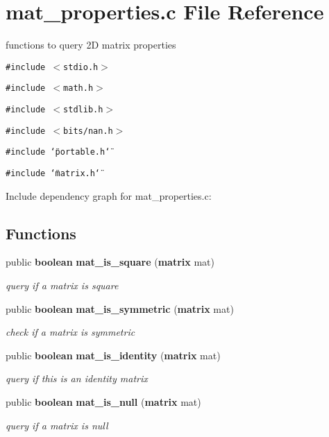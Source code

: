 \section{mat\_\-properties.c File Reference}
\label{mat__properties_8c}
functions to query 2D matrix properties 


{\tt \#include $<$stdio.h$>$}\par
{\tt \#include $<$math.h$>$}\par
{\tt \#include $<$stdlib.h$>$}\par
{\tt \#include $<$bits/nan.h$>$}\par
{\tt \#include \char`\"{}portable.h\char`\"{}}\par
{\tt \#include \char`\"{}matrix.h\char`\"{}}\par


Include dependency graph for mat\_\-properties.c:\subsection*{Functions}
\begin{CompactItemize}
\item 
public {\bf boolean} {\bf mat\_\-is\_\-square} ({\bf matrix} mat)
\begin{CompactList}\small\item\em query if a matrix is square\item\end{CompactList}\item 
public {\bf boolean} {\bf mat\_\-is\_\-symmetric} ({\bf matrix} mat)
\begin{CompactList}\small\item\em check if a matrix is symmetric\item\end{CompactList}\item 
public {\bf boolean} {\bf mat\_\-is\_\-identity} ({\bf matrix} mat)
\begin{CompactList}\small\item\em query if this is an identity matrix\item\end{CompactList}\item 
public {\bf boolean} {\bf mat\_\-is\_\-null} ({\bf matrix} mat)
\begin{CompactList}\small\item\em query if a matrix is null\item\end{CompactList}\end{CompactItemize}


